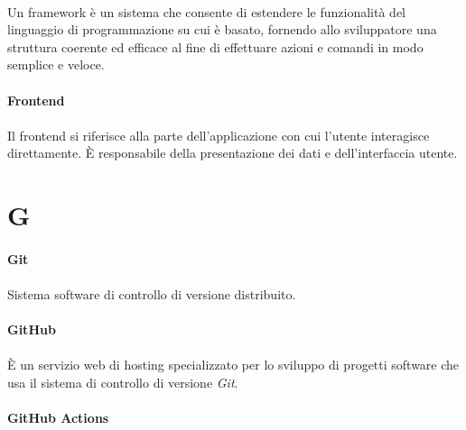 \documentclass[10pt, a4paper]{article}
\begin{document}
\paragraph{}Un framework è un sistema che consente di estendere le funzionalità del linguaggio di programmazione su cui è basato, fornendo allo sviluppatore una struttura coerente ed efficace al fine di effettuare azioni e comandi in modo semplice e veloce.

\vspace{2em}
\paragraph{Frontend}\noindent\hrulefill
\paragraph{}Il frontend si riferisce alla parte dell'applicazione con cui l'utente interagisce direttamente. È responsabile della presentazione dei dati e dell'interfaccia utente.

\newpage
\section{G}
\vspace{2em}
\paragraph{Git}\noindent\hrulefill
\paragraph{}Sistema software di controllo di versione distribuito.

\vspace{2em}
\paragraph{GitHub}\noindent\hrulefill
\paragraph{}È un servizio web di hosting specializzato per lo sviluppo di progetti software 
che usa il sistema di controllo di versione \textit{Git\pg}.

\vspace{2em}
\paragraph{GitHub Actions}\noindent\hrulefill
\end{document}
